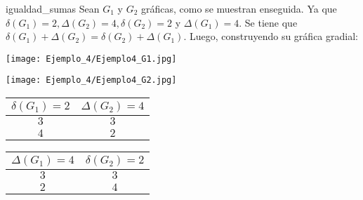 \documentclass[fleqn, 11pt]{beamer}
\begin{document}
    \begin{ejemplo}[beforeafter skip = 4mm]{}{igualdad_sumas}
        Sean $ G_1 $ y $ G_2 $ gráficas, como se muestran enseguida. Ya que $ \delta(G_1) = 2, \Delta(G_2) = 4, \delta(G_2) = 2 $ y $ \Delta(G_1) = 4 $. Se tiene que $ \delta(G_1) + \Delta(G_2) = \delta(G_2) + \Delta(G_1) $. Luego, construyendo su gráfica gradial: \vspace{2mm}

        \begin{center}
            \begin{minipage}[h]{0.6\linewidth}
                \begin{minipage}[h]{0.45\linewidth}
                    \texttt{[image: Ejemplo\_4/Ejemplo4\_G1.jpg]}
                \end{minipage} 
                \begin{minipage}[h]{0.45\linewidth}
                    \texttt{[image: Ejemplo\_4/Ejemplo4\_G2.jpg]}
                \end{minipage} 
    
                \begin{minipage}[h]{0.45\linewidth}
                    \begin{tcolorbox}[title empty, colframe = black!99!white, colback = white, sharp corners, hbox, nobeforeafter, left = -0.9mm, right = -0.9mm, top = -0.9mm, bottom = -0.9mm]
                        \begin{tabular}{c|c}
                            \rowcolor{gray!36!white} 
                            $ \delta(G_1) = 2 $ & $ \Delta(G_2) = 4 $ \\ \hline \hline
                            $ 3 $               & $ 3 $ \\ \hline
                            $ 4 $               & $ 2 $
                        \end{tabular}
                    \end{tcolorbox}
                \end{minipage}
                \begin{minipage}[h]{0.45\linewidth}
                    \begin{tcolorbox}[title empty, colframe = black!99!white, colback = white, sharp corners, hbox, nobeforeafter, left = -0.9mm, right = -0.9mm, top = -0.9mm, bottom = -0.9mm]
                        \begin{tabular}{c|c}
                            \rowcolor{gray!36!white} 
                            $ \Delta(G_1) = 4 $ & $ \delta(G_2) = 2 $ \\ \hline \hline
                            $ 3 $               & $ 3 $ \\ \hline
                            $ 2 $               & $ 4 $
                        \end{tabular}
                    \end{tcolorbox}
                \end{minipage}
            \end{minipage}
            \begin{minipage}[h]{0.25\linewidth}
                \centering
                

\end{minipage}
\end{center}
\end{ejemplo}
\end{document}
